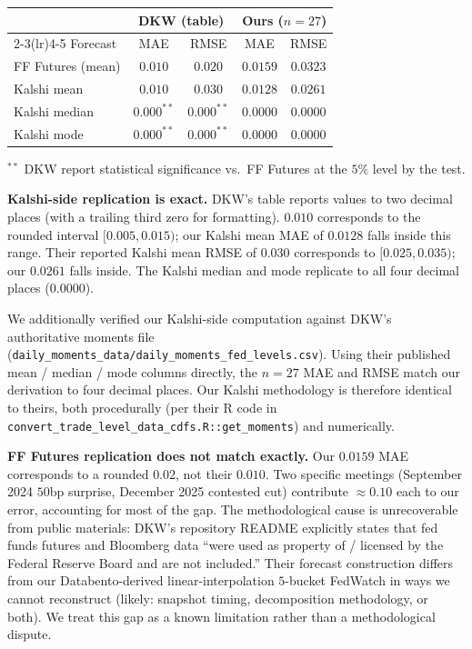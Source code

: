 \documentclass[11pt]{article}
\begin{document}
\begin{center}
\begin{tabular}{lcccc}
\toprule
& \multicolumn{2}{c}{DKW (table)} & \multicolumn{2}{c}{Ours ($n=27$)} \\
\cmidrule(lr){2-3}\cmidrule(lr){4-5}
Forecast & MAE & RMSE & MAE & RMSE \\
\midrule
FF Futures (mean) & $0.010$    & $0.020$    & $0.0159$ & $0.0323$ \\
Kalshi mean       & $0.010$    & $0.030$    & $0.0128$ & $0.0261$ \\
Kalshi median     & $0.000^{**}$ & $0.000^{**}$ & $0.0000$ & $0.0000$ \\
Kalshi mode       & $0.000^{**}$ & $0.000^{**}$ & $0.0000$ & $0.0000$ \\
\bottomrule
\end{tabular}
\end{center}

\noindent$^{**}$ DKW report statistical significance vs.\ FF Futures
at the $5\%$ level by the \citet{diebold-mariano1995} test.

\textbf{Kalshi-side replication is exact.} DKW's table reports
values to two decimal places (with a trailing third zero for
formatting). $0.010$ corresponds to the rounded interval
$[0.005,0.015)$; our Kalshi mean MAE of $0.0128$ falls inside this
range. Their reported Kalshi mean RMSE of $0.030$ corresponds to
$[0.025,0.035)$; our $0.0261$ falls inside. The Kalshi median and
mode replicate to all four decimal places ($0.0000$).

We additionally verified our Kalshi-side computation against DKW's
authoritative moments file
(\texttt{daily\_moments\_data/daily\_moments\_fed\_levels.csv}). Using
their published mean / median / mode columns directly, the $n=27$ MAE
and RMSE match our derivation to four decimal places. Our Kalshi
methodology is therefore identical to theirs, both procedurally (per
their R code in
\texttt{convert\_trade\_level\_data\_cdfs.R::get\_moments}) and
numerically.

\textbf{FF Futures replication does not match exactly.} Our $0.0159$
MAE corresponds to a rounded $0.02$, not their $0.010$. Two specific
meetings (September 2024 $50$bp surprise, December 2025 contested cut)
contribute $\approx 0.10$ each to our error, accounting for most of
the gap. The methodological cause is unrecoverable from public
materials: DKW's repository README explicitly states that fed funds
futures and Bloomberg data ``were used as property of / licensed by
the Federal Reserve Board and are not included.'' Their forecast
construction differs from our Databento-derived linear-interpolation
$5$-bucket FedWatch in ways we cannot reconstruct (likely: snapshot
timing, decomposition methodology, or both). We treat this gap as a
known limitation rather than a methodological dispute.
\end{document}
